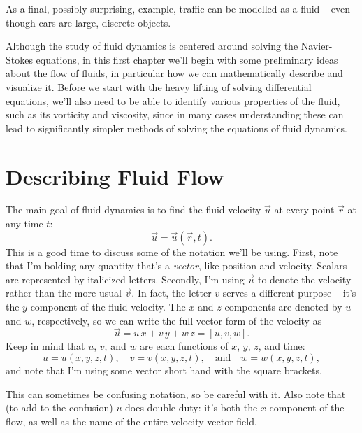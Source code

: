 As a final, possibly surprising, example, traffic can be modelled as a fluid -- even though cars are large, discrete objects.

Although the study of fluid dynamics is centered around solving the Navier-Stokes equations, in this first chapter we'll begin with some preliminary ideas about the flow of fluids, in particular how we can mathematically describe and visualize it.  Before we start with the heavy lifting of solving differential equations, we'll also need to be able to identify various properties of the fluid, such as its vorticity and viscosity, since in many cases understanding these can lead to significantly simpler methods of solving the equations of fluid dynamics.

%
%
%

\section{Describing Fluid Flow}

The main goal of fluid dynamics is to find the fluid velocity $\vec{u}$ at every point $\vec{r}$ at any time $t$:
\begin{equation}
\vec{u} = \vec{u}(\vec{r}, t).
\end{equation}
This is a good time to discuss some of the notation we'll be using.  First, note that I'm bolding any quantity that's a \emph{vector}, like position and velocity.  Scalars are represented by italicized letters.  Secondly, I'm using $\vec{u}$ to denote the velocity rather than the more usual $\vec{v}$. In fact, the letter $v$ serves a different purpose -- it's the $y$ component of the fluid velocity. The $x$ and $z$ components are denoted by $u$ and $w$, respectively, so we can write the full vector form of the velocity as
\begin{equation}
\vec{u} = u \, \unit{x} + v \, \unit{y} + w \, \unit{z} = [u, v, w].
\end{equation}
Keep in mind that $u$, $v$, and $w$ are each functions of $x$, $y$, $z$, and time:
\[
u = u(x, y, z, t), \quad v = v(x, y, z, t), \quad \text{and} \quad w = w(x, y, z, t),
\]
and note that I'm using some vector short hand with the square brackets.

This can sometimes be confusing notation, so be careful with it.  Also note that (to add to the confusion) $u$ does double duty: it's both the $x$ component of the flow, as well as the name of the entire velocity vector field.


